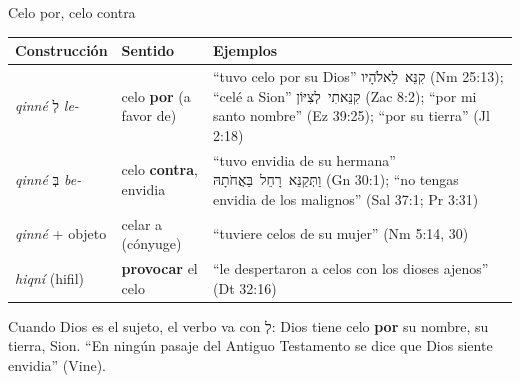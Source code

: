 \documentclass[hyperref={bookmarks=false},aspectratio=169]{beamer}
\newcommand{\heb}[1]{\mbox{\foreignlanguage{hebrew}{#1}}}
\newcommand{\destacar}[1]{\textbf{\textcolor{azul}{#1}}}
\begin{document}
\begin{frame}{Celo por, celo contra}
\scriptsize\renewcommand{\arraystretch}{1.18}
\begin{tabular}{@{}>{\RaggedRight\arraybackslash}p{2.6cm}>{\RaggedRight\arraybackslash}p{3.6cm}>{\RaggedRight\arraybackslash}p{5.6cm}@{}}
\toprule
\textbf{Construcción} & \textbf{Sentido} & \textbf{Ejemplos} \\ \midrule
\emph{qinné} \heb{לְ} \emph{le-} & celo \destacar{por} (a favor de) & ``tuvo celo por su Dios'' \heb{קִנֵּא לֵאלֹהָיו} (Nm 25:13); ``celé a Sion'' \heb{קִנֵּאתִי לְצִיּוֹן} (Zac 8:2); ``por mi santo nombre'' (Ez 39:25); ``por su tierra'' (Jl 2:18) \\
\emph{qinné} \heb{בְּ} \emph{be-} & celo \destacar{contra}, envidia & ``tuvo envidia de su hermana'' \heb{וַתְּקַנֵּא רָחֵל בַּאֲחֹתָהּ} (Gn 30:1); ``no tengas envidia de los malignos'' (Sal 37:1; Pr 3:31) \\
\emph{qinné} + objeto & celar a (cónyuge) & ``tuviere celos de su mujer'' (Nm 5:14, 30) \\
\emph{hiqní} (hifil) & \destacar{provocar} el celo & ``le despertaron a celos con los dioses ajenos'' (Dt 32:16) \\
\bottomrule
\end{tabular}\par\medskip
\begin{tcolorbox}[colback=papiro,colframe=dorado,boxrule=1.2pt,arc=3pt]
\small Cuando Dios es el sujeto, el verbo va con \heb{לְ}: Dios tiene celo \destacar{por} su nombre, su tierra, Sion. ``En ningún pasaje del Antiguo Testamento se dice que Dios siente envidia'' (Vine).
\end{tcolorbox}
\end{frame}
\end{document}
